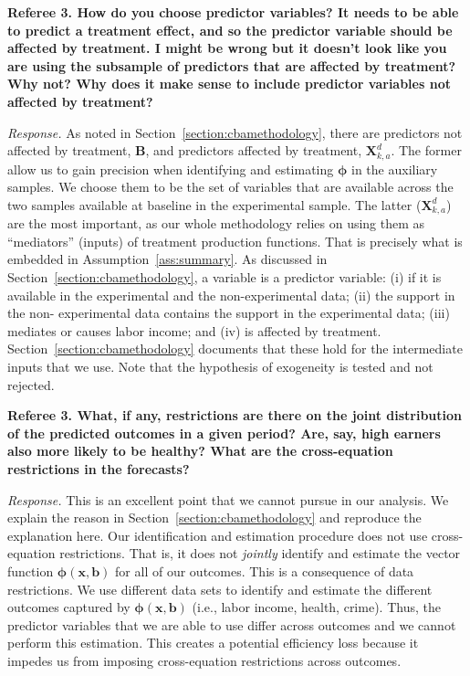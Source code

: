 \noindent \textbf{Referee 3. How do you choose predictor variables? It needs to be able to predict a treatment effect, and so the predictor variable should be affected by treatment. I might be wrong but it doesn't look like you are using the subsample of predictors that are affected by treatment? Why not? Why does it make sense to include predictor variables not affected by treatment?}

\noindent \textit{Response.} As noted in Section~\ref{section:cbamethodology}, there are predictors not affected by treatment, $\bm{B}$, and predictors affected by treatment, $\bm{X}_{k,a}^d$. The former allow us to gain precision when identifying and estimating $\bm{\phi}$ in the auxiliary samples. We choose them to be the set of variables that are available across the two samples available at baseline in the experimental sample. The latter ($\bm{X}_{k,a}^d$) are the most important, as our whole methodology relies on using them as ``mediators'' (inputs) of treatment production functions. That is precisely what is embedded in Assumption~\ref{ass:summary}. As discussed in Section~\ref{section:cbamethodology}, a variable is a predictor variable: (i) if it is available in the experimental and the non-experimental data; (ii) the support in the non- experimental data contains the support in the experimental data; (iii) mediates or causes labor income; and (iv) is affected by treatment. Section~\ref{section:cbamethodology} documents that these hold for the intermediate inputs that we use. Note that the hypothesis of exogeneity is tested and not rejected.

\noindent \textbf{Referee 3. What, if any, restrictions are there on the joint distribution of the predicted outcomes in a given period? Are, say, high earners also more likely to be healthy? What are the cross-equation restrictions in the forecasts?}

\noindent \textit{Response.} This is an excellent point that we cannot pursue in our analysis. We explain the reason in Section~\ref{section:cbamethodology} and reproduce the explanation here. Our identification and estimation procedure does not use cross-equation restrictions. That is, it does not \emph{jointly} identify and estimate the vector function $\bm{\phi} \left( \bm{x}, \bm{b} \right)$ for all of our outcomes. This is a consequence of data restrictions. We use different data sets to identify and estimate the different outcomes captured by $\bm{\phi} \left( \bm{x}, \bm{b} \right)$ (i.e., labor income, health, crime). Thus, the predictor variables that we are able to use differ across outcomes and we cannot perform this estimation. This creates a potential efficiency loss because it impedes us from imposing cross-equation restrictions across outcomes.

